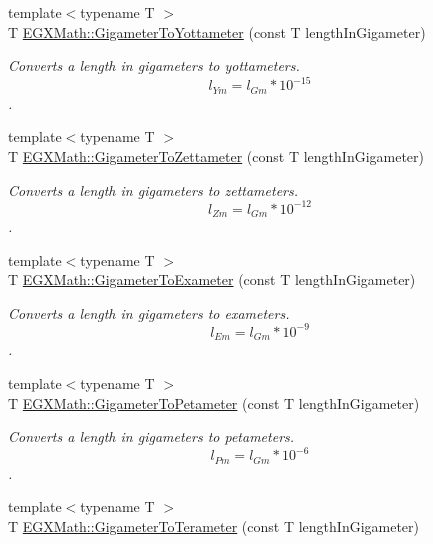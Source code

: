 \begin{DoxyCompactItemize}
{\footnotesize template$<$typename T $>$ }\\T \mbox{\hyperlink{group___e_g_x_math-_conversions-_length_conversions-_s_i-_gigameter-_s_i_ga311d6ae40f97487de660c9fb0310ec5e}{E\+G\+X\+Math\+::\+Gigameter\+To\+Yottameter}} (const T length\+In\+Gigameter)
\begin{DoxyCompactList}\small\item\em Converts a length in gigameters to yottameters. \[ l_{Ym}=l_{Gm} * 10^{-15} \]. \end{DoxyCompactList}\item 
{\footnotesize template$<$typename T $>$ }\\T \mbox{\hyperlink{group___e_g_x_math-_conversions-_length_conversions-_s_i-_gigameter-_s_i_gaaaefaf67b876bfdeccd8176508e765e3}{E\+G\+X\+Math\+::\+Gigameter\+To\+Zettameter}} (const T length\+In\+Gigameter)
\begin{DoxyCompactList}\small\item\em Converts a length in gigameters to zettameters. \[ l_{Zm}=l_{Gm} * 10^{-12} \]. \end{DoxyCompactList}\item 
{\footnotesize template$<$typename T $>$ }\\T \mbox{\hyperlink{group___e_g_x_math-_conversions-_length_conversions-_s_i-_gigameter-_s_i_ga38ebe6bd7f8d4dd09cadc8d08caf90eb}{E\+G\+X\+Math\+::\+Gigameter\+To\+Exameter}} (const T length\+In\+Gigameter)
\begin{DoxyCompactList}\small\item\em Converts a length in gigameters to exameters. \[ l_{Em}=l_{Gm} * 10^{-9} \]. \end{DoxyCompactList}\item 
{\footnotesize template$<$typename T $>$ }\\T \mbox{\hyperlink{group___e_g_x_math-_conversions-_length_conversions-_s_i-_gigameter-_s_i_gae0dceabe14b5e84394285441be46bb8d}{E\+G\+X\+Math\+::\+Gigameter\+To\+Petameter}} (const T length\+In\+Gigameter)
\begin{DoxyCompactList}\small\item\em Converts a length in gigameters to petameters. \[ l_{Pm}=l_{Gm} * 10^{-6} \]. \end{DoxyCompactList}\item 
{\footnotesize template$<$typename T $>$ }\\T \mbox{\hyperlink{group___e_g_x_math-_conversions-_length_conversions-_s_i-_gigameter-_s_i_ga7cab1971a673d663a4eadd070afedf7e}{E\+G\+X\+Math\+::\+Gigameter\+To\+Terameter}} (const T length\+In\+Gigameter)

\end{DoxyCompactItemize}
